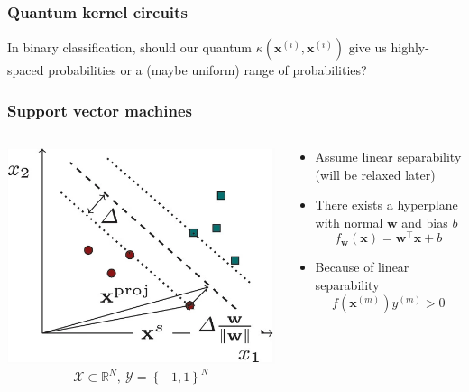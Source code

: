 \documentclass[aspectratio=43]{beamer}
\newcommand{\R}{\mathbb{R}}  %
\newcommand{\kernel}[2]{\kappa\left( #1, #2 \right)}
\begin{document}
\begin{frame}
  \frametitle{Quantum kernel circuits}

  \centering
  \color{red} In binary classification, should our quantum $\kernel{\mathbf{x}^{(i)}}{\mathbf{x}^{(i)}}$ give us highly-spaced probabilities or a (maybe uniform) range of probabilities?

\end{frame}


\begin{frame}
  \frametitle{Support vector machines}

  \begin{columns}[onlytextwidth]
    \begin{column}{.5\textwidth}
      \centering
      \includegraphics[width=\textwidth]{pics/supp-vecs.png}
      \[\mathcal{X} \subset \R^N,\: \mathcal{Y} = \left\{ -1,1 \right\}^N\]
    \end{column}
    \begin{column}{.5\textwidth}
      \small
      \begin{itemize}
        \item<2-> Assume linear separability (will be relaxed later)
        \item<3-> There exists a hyperplane with normal $\mathbf{w}$ and bias $b$
        \[f_\mathbf{w}(\mathbf{x}) = \mathbf{w}^\top \mathbf{x} + b\]
        \item<4-> Because of linear separability
      \[f\left( \mathbf{x}^{(m)} \right)y^{(m)} > 0\] 
      \end{itemize}
    \end{column}
  \end{columns}

\end{frame}
\end{document}
